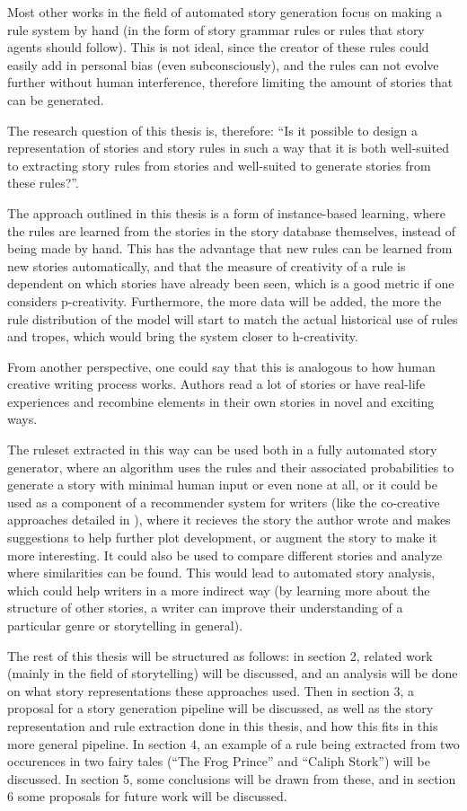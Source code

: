 Most other works in the field of automated story generation focus on making a
rule system by hand (in the form of story grammar rules or rules that story agents should follow).
This is not ideal, since the creator of these rules could easily add in personal
bias (even subconsciously), and the rules can not evolve further without human
interference, therefore limiting the amount of stories that can be generated.

The research question of this thesis is, therefore: ``Is it possible to design a
representation of stories and story rules in such a way that it is both 
well-suited to extracting story rules from stories and well-suited to generate 
stories from these rules?''.

The approach outlined in this thesis is a form of instance-based learning, where the
rules are learned from the stories in the story database themselves, instead of
being made by hand. This has
the advantage that new rules can be learned from new stories automatically, and
that the measure of creativity of a rule is dependent on which stories have already been seen,
which is a good metric if one considers p-creativity. Furthermore, the more data
will be added, the more the rule distribution of the model will start to match 
the actual historical use of rules and tropes, which would bring the system closer to
h-creativity.

From another perspective, one could say that this is analogous to how human
creative writing process works. Authors read a lot of stories or have real-life
experiences and recombine elements in their own stories in novel and exciting ways.

The ruleset extracted in this way can be used both in a fully automated story
generator, where an algorithm uses the rules and their associated probabilities
to generate a story with minimal human input or even none at all, or it could be used as a component
of a recommender system for writers (like the co-creative approaches detailed in
\cite{kantosalo2014isolation}), where it recieves the story the author
wrote and makes suggestions to help further plot development, or augment the
story to make it more interesting. It could also be used to compare different
stories and analyze where similarities can be found. This would lead to
automated story analysis, which could help writers in a more indirect way (by
learning more about the structure of other stories, a writer can improve their
understanding of a particular genre or storytelling in general).

The rest of this thesis will be structured as follows: in section 2, related
work (mainly in the field of storytelling) will be discussed, and an analysis
will be done on what story representations these approaches used. Then in
section 3, a proposal for a story generation pipeline will be discussed, as well
as the story representation and rule extraction done in this thesis, and how
this fits in this more general pipeline. In section 4, an example of a rule
being extracted from two occurences in two fairy tales (``The Frog Prince'' and
``Caliph Stork'') will be discussed. In section 5, some conclusions will be 
drawn from these,
and in section 6 some proposals for future work will be discussed.
